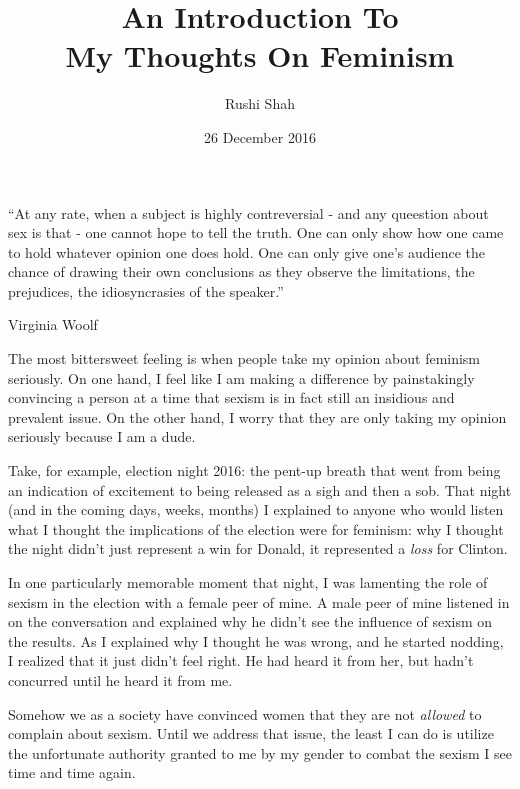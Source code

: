 \documentclass{article}
\author{Rushi Shah}
\date{26 December 2016}
\title{An Introduction To \\ My Thoughts On Feminism}
\begin{document}
\maketitle

	\epigraph{``At any rate, when a subject is highly contreversial - and any queestion about sex is that - one cannot hope to tell the truth. One can only show how one came to hold whatever opinion one does hold. One can only give one's audience the chance of drawing their own conclusions as they observe the limitations, the prejudices, the idiosyncrasies of the speaker.''}{Virginia Woolf}

	The most bittersweet feeling is when people take my opinion about feminism seriously. On one hand, I feel like I am making a difference by painstakingly convincing a person at a time that sexism is in fact still an insidious and prevalent issue. On the other hand, I worry that they are only taking my opinion seriously because I am a dude. 

	Take, for example, election night 2016: the pent-up breath that went from being an indication of excitement to being released as a sigh and then a sob. That night (and in the coming days, weeks, months) I explained to anyone who would listen what I thought the implications of the election were for feminism: why I thought the night didn't just represent a win for Donald, it represented a \textit{loss} for Clinton. 


	In one particularly memorable moment that night, I was lamenting the role of sexism in the election with a female peer of mine. A male peer of mine listened in on the conversation and explained why he didn't see the influence of sexism on the results. As I explained why I thought he was wrong, and he started nodding, I realized that it just didn't feel right. He had heard it from her, but hadn't concurred until he heard it from me. 

	Somehow we as a society have convinced women that they are not \textit{allowed} to complain about sexism. Until we address that issue, the least I can do is utilize the unfortunate authority granted to me by my gender to combat the sexism I see time and time again. 

\end{document}
